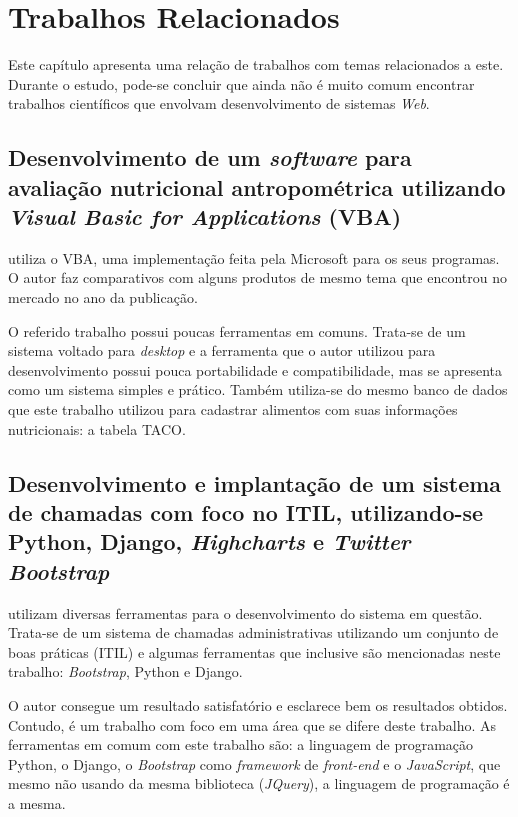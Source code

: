 \documentclass[
	12pt,				%
    oneside,			%
	a4paper,			%
	english,			%
	french,				%
	spanish,			%
	brazil,				%
	]{abntex2}
\begin{document}
\chapter{Trabalhos Relacionados}

Este capítulo apresenta uma relação de trabalhos com temas relacionados a este. Durante o estudo, pode-se concluir que ainda não é muito comum encontrar trabalhos científicos que envolvam desenvolvimento de sistemas \textit{Web}. 

\section{Desenvolvimento de um \textit{software} para avaliação nutricional antropométrica utilizando \textit{Visual Basic for Applications} (VBA)}

utiliza o VBA, uma implementação feita pela Microsoft para os seus programas. O autor faz comparativos com alguns produtos de mesmo tema que encontrou no mercado no ano da publicação.

O referido trabalho possui poucas ferramentas em comuns. Trata-se de um sistema voltado para \textit{desktop} e a ferramenta que o autor utilizou para desenvolvimento possui pouca portabilidade e compatibilidade, mas se apresenta como um sistema simples e prático. Também utiliza-se do mesmo banco de dados que este trabalho utilizou para cadastrar alimentos com suas informações nutricionais: a tabela TACO.


\section{Desenvolvimento e implantação de um sistema de chamadas com foco no ITIL, utilizando-se Python, Django, \textit{Highcharts} e \textit{Twitter Bootstrap}}

 utilizam diversas ferramentas para o desenvolvimento do sistema em questão. Trata-se de um sistema de chamadas administrativas utilizando um conjunto de boas práticas (ITIL) e algumas ferramentas que inclusive são mencionadas neste trabalho: \textit{Bootstrap}, Python e Django.

O autor consegue um resultado satisfatório e esclarece bem os resultados obtidos. Contudo, é um trabalho com foco em uma área que se difere deste trabalho. As ferramentas em comum com este trabalho são: a linguagem de programação Python, o Django, o \textit{Bootstrap} como \textit{framework} de \textit{front-end} e o \textit{JavaScript}, que mesmo não usando da mesma biblioteca (\textit{JQuery}), a linguagem de programação é a mesma.
\end{document}
